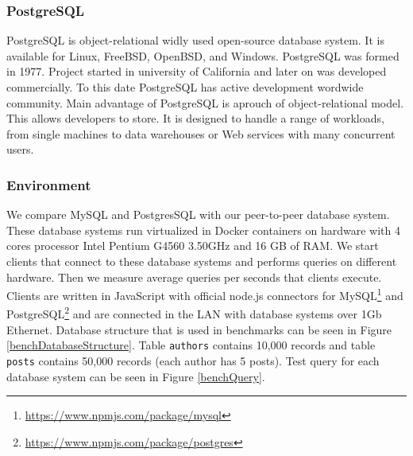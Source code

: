 \subsubsection{PostgreSQL}
PostgreSQL is object-relational widly used open-source database system. It is available for Linux, FreeBSD, OpenBSD, and Windows. PostgreSQL was formed in 1977. Project started in university of California and later on was developed commercially. To this date PostgreSQL has active development wordwide community. Main advantage of PostgreSQL is aprouch of object-relational model. This allows developers to store. It is designed to handle a range of workloads, from single machines to data warehouses or Web services with many concurrent users. \cite{drake2002practical}

\subsubsection{Environment}
We compare MySQL and PostgresSQL with our peer-to-peer database system. These database systems run virtualized in Docker containers on hardware with 4 cores processor Intel Pentium G4560 3.50GHz and 16 GB of RAM.  We start clients that connect to these database systems and performs queries on different hardware. Then we measure average queries per seconds that clients execute. Clients are written in JavaScript with official node.js connectors for MySQL\footnote{\url{https://www.npmjs.com/package/mysql}} and PostgreSQL\footnote{\url{https://www.npmjs.com/package/postgres}} and are connected in the LAN with database systems over 1Gb Ethernet. Database structure that is used in benchmarks can be seen in Figure \ref{benchDatabaseStructure}. Table \texttt{authors} contains 10,000 records and table \texttt{posts} contains 50,000 records (each author has 5 posts). Test query for each database system can be seen in Figure \ref{benchQuery}.

